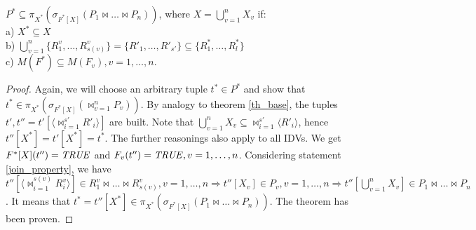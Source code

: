 \def \bigcupn {\bigcup\limits_{v=1}^{n}}
\begin{theorem}
$P^{\ast} \subseteq \pi_{X^{\ast}} ( \sigma_{F^{\ast}[X]} (P_1 \Join \dots \Join
P_n))$, where $X = \bigcupn X_{v}$ if:
\\a) $X^{\ast} \subseteq X$
\\b)
$ \bigcupn \{R^{v}_{1}, \ldots, R^{v}_{s(v)}\} = \{R'_{1}, \ldots, R'_{s'}\}
\subseteq
\{R^{\ast}_{1}, \ldots, R^{\ast}_{l}\} $
\\c) $M(F^{\ast}) \subseteq M(F_{v}), v = 1,\dots,n $.

\label{th_mult}
\end{theorem}
\begin{proof}
Again, we will choose an arbitrary tuple $t^{\ast} \in P^{\ast}$
and show that $t^{\ast} \in \pi_{X^{\ast}} ( \sigma_{F^{\ast}[X]}
(\Join_{v=1}^{n} P_{v}))$. By analogy to theorem \ref{th_base}, the tuples $t',
t'' = t'[\langle {\Join}_{i=1}^{s'} R'_i \rangle]$ are built.
Note that  $\bigcupn X_{v} \subseteq {\Join}_{i=1}^{s'} \langle R'_i \rangle$, hence
$t''[X^{\ast}] = t'[X^{\ast}] = t^{\ast}$.
The further reasonings also apply to all IDVs.
We get $F^{\ast} [X] (t'') = \mathit{TRUE}$ and $F_v (t'') = \mathit{TRUE}, v = 1,\dots,n $.
Considering statement \ref{join_property}, we have $t''[\langle
\Join_{i=1}^{s(v)} R^v_i \rangle]
\in 
R^v_1 \Join \dots \Join R^v_{s(v)}, v = 1, \dots, n
\Rightarrow   
t''[X_v] \in P_v, v = 1, \dots, n
\Rightarrow
t''[\bigcupn X_{v}] \in P_1 \Join \dots \Join P_n$.
It means that $t^{\ast} = t''[X^{\ast}] \in 
\pi_{X^{\ast}} ( \sigma_{F^{\ast}[X]} (P_1 \Join \dots \Join P_n))$.
The theorem has been proven.
\end{proof}
